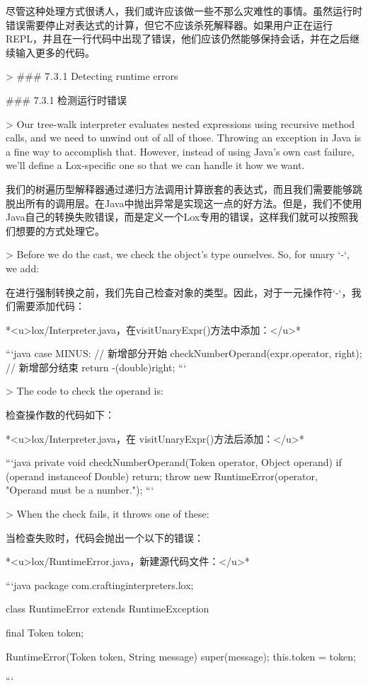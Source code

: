 \documentclass[cn,11pt,chinese]{elegantbook}
\begin{document}
{{{{尽管这种处理方式很诱人，我们或许应该做一些不那么灾难性的事情。虽然运行时错误需要停止对表达式的计算，但它不应该杀死解释器。如果用户正在运行REPL，并且在一行代码中出现了错误，他们应该仍然能够保持会话，并在之后继续输入更多的代码。

> ### 7 . 3 . 1 Detecting runtime errors

### 7.3.1 检测运行时错误

> Our tree-walk interpreter evaluates nested expressions using recursive method calls, and we need to unwind out of all of those. Throwing an exception in Java is a fine way to accomplish that. However, instead of using Java’s own cast failure, we’ll define a Lox-specific one so that we can handle it how we want.

我们的树遍历型解释器通过递归方法调用计算嵌套的表达式，而且我们需要能够跳脱出所有的调用层。在Java中抛出异常是实现这一点的好方法。但是，我们不使用Java自己的转换失败错误，而是定义一个Lox专用的错误，这样我们就可以按照我们想要的方式处理它。

> Before we do the cast, we check the object’s type ourselves. So, for unary `-`, we add:

在进行强制转换之前，我们先自己检查对象的类型。因此，对于一元操作符`-`，我们需要添加代码：

*<u>lox/Interpreter.java，在visitUnaryExpr()方法中添加：</u>*

```java
      case MINUS:
        // 新增部分开始
       	checkNumberOperand(expr.operator, right);
       	// 新增部分结束
        return -(double)right;
```

> The code to check the operand is:

检查操作数的代码如下：

*<u>lox/Interpreter.java，在 visitUnaryExpr()方法后添加：</u>*

```java
  private void checkNumberOperand(Token operator, Object operand) {
    if (operand instanceof Double) return;
    throw new RuntimeError(operator, "Operand must be a number.");
  }
```

> When the check fails, it throws one of these:

当检查失败时，代码会抛出一个以下的错误：

*<u>lox/RuntimeError.java，新建源代码文件：</u>*

```java
package com.craftinginterpreters.lox;

class RuntimeError extends RuntimeException {
  final Token token;

  RuntimeError(Token token, String message) {
    super(message);
    this.token = token;
  }
}
```

}}}}
\end{document}
